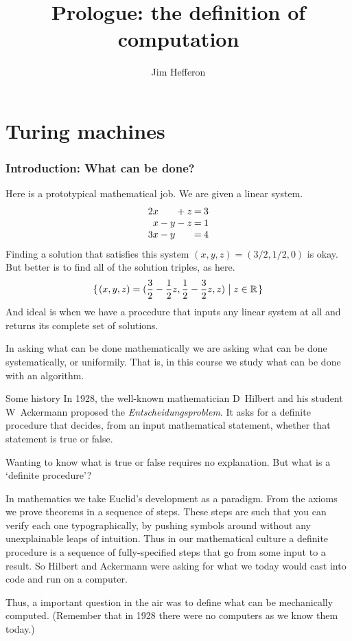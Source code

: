 \documentclass[9pt,t,serif,professionalfont,xcolor={table,dvipsnames},noamsthm]{beamer}
\title{Prologue: the definition of computation}
\author{Jim Hef{}feron}
\institute{
  University of Vermont\\[1ex]
  \texttt{hefferon.net}
}
\date{}
\begin{document}
\begin{frame}
  \titlepage
\end{frame}




\section{Turing machines}
\begin{frame}
  \frametitle{Introduction: What can be done?}

Here is a prototypical mathematical job.
We are given a linear system.
\begin{equation*}\setlength{\arraycolsep}{.1111em}
\begin{array}{@{}*{3}{rc}r@{}}
  2x &  &   &+ &z  &=  &3   \\
   x &- &y  &- &z  &=  &1   \\
  3x &- &y  &  &   &=  &4   \\
\end{array}
\end{equation*}
Finding a solution 
that satisfies this system $(x,y,z)=(3/2,1/2,0)$  is okay.
But better is to find all of the solution triples, as here.
\begin{equation*}
  \set{(x,y,z)=(\frac{3}{2}-\frac{1}{2}z, \frac{1}{2}-\frac{3}{2}z, z)\suchthat z\in\R}
\end{equation*}
And ideal is when we have a procedure that inputs any
linear system at all and returns its complete set of solutions.

\pause\medskip
In asking what can be done mathematically we are asking what can be done 
systematically, or uniformily.
That is, in this course we study what can be done with an algorithm.
\end{frame}


\begin{frame}{Some history}
In 1928, the well-known mathematician
D~Hilbert and his student W~Ackermann proposed the
\textit{Entscheidungsproblem}.
It asks for a definite procedure
that decides, from an input mathematical
statement, whether that statement is true or false.

Wanting to know what is true or false requires no explanation.
But what is a `definite procedure'?

In mathematics we take Euclid's development as a paradigm.
From the axioms we prove theorems in a sequence of steps.
These steps are such that you can verify each one 
typographically, 
by pushing symbols around without any unexplainable leaps of
intuition.
Thus in our mathematical culture 
a definite procedure is a sequence of fully-specified
steps that go from some input to a result.
So Hilbert and Ackermann were asking for 
what we today would cast into code and run on a computer.

Thus, a important question in the air was to 
define what can be mechanically computed.
(Remember that in 1928 there were no computers as we know them today.)
\end{frame}
\end{document}
